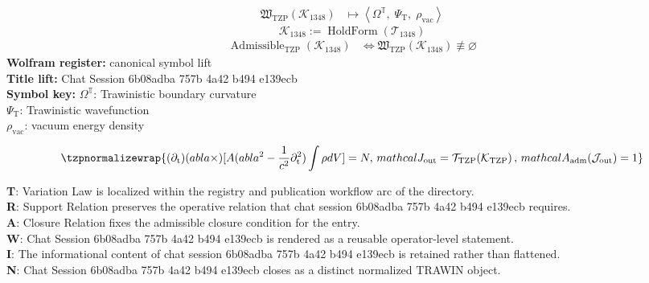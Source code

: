 \noindent
\begin{minipage}[t]{0.48\linewidth}
\begingroup
\small
\[
\begin{aligned}
\mathfrak{W}_{\mathrm{TZP}}\!\left(\mathcal{K}_{1348}\right)
&\longmapsto
\left\langle \Omega^{\mathbb{T}},\; \Psi_{\mathrm{T}},\; \rho_{\mathrm{vac}} \right\rangle
\end{aligned}
\]
\[
\mathcal{K}_{1348}
:=
\operatorname{HoldForm}\!\left(\mathcal{T}_{1348}\right)
\]
\[
\begin{aligned}
\operatorname{Admissible}_{\mathrm{TZP}}\!\left(\mathcal{K}_{1348}\right)
&\Longleftrightarrow
\mathfrak{W}_{\mathrm{TZP}}\!\left(\mathcal{K}_{1348}\right)\not\equiv\varnothing
\end{aligned}
\]
\textbf{Wolfram register:} canonical symbol lift\\
\textbf{Title lift:} Chat Session 6b08adba 757b 4a42 b494 e139ecb\\
\textbf{Symbol key:} \(\Omega^{\mathbb{T}}\): Trawinistic boundary curvature\\ \(\Psi_{\mathrm{T}}\): Trawinistic wavefunction\\ \(\rho_{\mathrm{vac}}\): vacuum energy density
\par
\endgroup
\end{minipage}\hfill
\begin{minipage}[t]{0.48\linewidth}
\[
\tzpnormalizewrap{(\partial_{\mathrm{t}})( abla \times)[A ( abla^2 - \frac{1}{c^2}\partial_{\mathrm{t}}^2) \int \rho dV] = N,\,mathcal{J}_{\mathrm{out}} = \mathcal{T}_{\mathrm{TZP}}\!\left(\mathcal{K}_{\mathrm{TZP}}\right),\,mathcal{A}_{\mathrm{adm}}\!\left(\mathcal{J}_{\mathrm{out}}\right)=1}
\]

\small
\textbf{T}: Variation Law is localized within the registry and publication workflow arc of the directory.\\
\textbf{R}: Support Relation preserves the operative relation that chat session 6b08adba 757b 4a42 b494 e139ecb requires.\\
\textbf{A}: Closure Relation fixes the admissible closure condition for the entry.\\
\textbf{W}: Chat Session 6b08adba 757b 4a42 b494 e139ecb is rendered as a reusable operator-level statement.\\
\textbf{I}: The informational content of chat session 6b08adba 757b 4a42 b494 e139ecb is retained rather than flattened.\\
\textbf{N}: Chat Session 6b08adba 757b 4a42 b494 e139ecb closes as a distinct normalized TRAWIN object.
\normalsize
\end{minipage}

